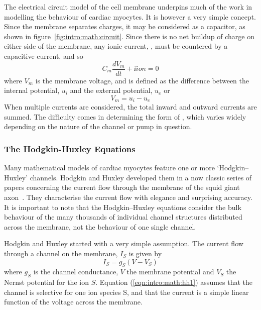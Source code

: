 The electrical circuit model of the cell membrane underpins much of the work in
modelling the behaviour of cardiac myocytes.
It is however a very simple concept.
Since the membrane separates charges, it may be considered as a capacitor, as
shown in figure~\ref{fig:intro:math:circuit}.
Since there is no net buildup of
charge on either side of the membrane, any ionic current, , must be
countered by a capacitive current, and so
\begin{equation}
C_{m}\frac{dV_{m}}{dt} + \ii{ion} = 0
\label{eqn:intro:math:basic}
\end{equation}
where $V_{m}$ is the membrane voltage, and is defined as the difference between
the internal potential, $u_{i}$ and the external potential, $u_{e}$ or
\begin{equation}
V_{m} = u_{i} - u_{e}
\label{eqn:intro:math:vm}
\end{equation}
When multiple currents are considered, the total inward and outward currents are
summed.
The difficulty comes in determining the form of , which varies widely
depending on the nature of the channel or pump in question.


\subsubsection{The Hodgkin-Huxley Equations}

Many mathematical models of cardiac myocytes feature one or more
`Hodgkin--Huxley' channels.
Hodgkin and Huxley developed them in a now classic series of papers concerning
the current flow through the membrane of the squid giant
axon~\cite{Hodgkin1952,Keener1998}.
They characterise the current flow with elegance and surprising accuracy.
It is important to note that the Hodgkin--Huxley equations consider the bulk
behaviour of the many thousands of individual channel structures distributed
across the membrane, not the behaviour of one single channel.

Hodgkin and Huxley started with a very simple assumption.
The current flow through a channel on the membrane, $I_{S}$ is given by
\begin{equation}
I_{S} = g_{S}\left(V-V_{S}\right)
\label{eqn:intro:math:hh1}
\end{equation}
where $g_{S}$ is the channel conductance, $V$ the membrane potential and $V_{S}$
the Nernst potential for the ion $S$.
Equation (\ref{eqn:intro:math:hh1}) assumes that the channel is selective for
one ion species S, and that the current is a simple linear function of the
voltage across the membrane.

